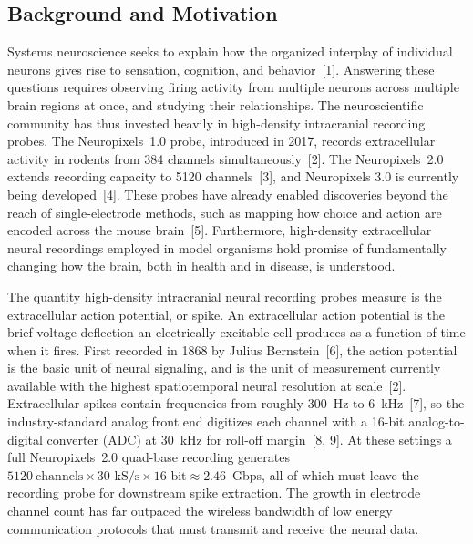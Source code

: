 \documentclass[11pt]{article}
\begin{document}
\subsection{Background and Motivation}
Systems neuroscience seeks to explain how the organized interplay of individual neurons
gives rise to sensation, cognition, and behavior~[1]. Answering these questions requires
observing firing activity from multiple neurons across multiple brain regions at once, and studying their relationships.
The neuroscientific community has thus invested heavily in high-density intracranial recording probes. The
Neuropixels~1.0 probe, introduced in 2017, records extracellular activity in rodents from
384 channels simultaneously~[2]. The Neuropixels~2.0 extends recording
capacity to 5120 channels~[3], and Neuropixels 3.0 is currently being developed~[4]. These probes
have already enabled discoveries beyond the reach of single-electrode methods, such as
mapping how choice and action are encoded across the mouse brain~[5]. Furthermore,
high-density extracellular neural recordings employed in model organisms hold promise of
fundamentally changing how the brain, both in health and in disease, is understood.

The quantity high-density intracranial neural recording probes measure is the extracellular action potential, or spike. An
extracellular action potential is the brief voltage deflection an electrically excitable 
cell produces as a function of time when it fires. First
recorded in 1868 by Julius Bernstein~[6], the action potential is the basic unit of neural signaling,
and is the unit of measurement currently available with the highest spatiotemporal neural resolution at scale~[2].
Extracellular spikes contain frequencies from roughly 300~Hz to 6~kHz~[7], so the
industry-standard analog front end digitizes each channel with a 16-bit
analog-to-digital converter (ADC) at 30~kHz for roll-off margin~[8, 9]. At these settings
a full Neuropixels~2.0 quad-base recording generates $5120~\text{channels} \times
30\text{~kS/s} \times 16\text{~bit} \approx 2.46$~Gbps, all of which must leave the
recording probe for downstream spike extraction. The growth in electrode channel count
has far outpaced the wireless bandwidth of low energy communication protocols
that must transmit and receive the neural data.
\end{document}

